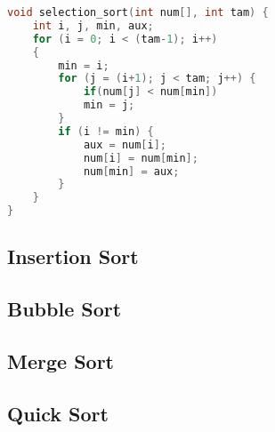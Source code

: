 \documentclass[10pt,a4paper]{article}
\begin{document}
\begin{lstlisting}[language=C++, caption={Selection Sort implemetação}]
void selection_sort(int num[], int tam) { 
	int i, j, min, aux;
  	for (i = 0; i < (tam-1); i++) 
  	{
     	min = i;
     	for (j = (i+1); j < tam; j++) {
       		if(num[j] < num[min]) 
         	min = j;
     	}
     	if (i != min) {
       		aux = num[i];
       		num[i] = num[min];
       		num[min] = aux;
     	}
  	}
}
\end{lstlisting}
\subsection{Insertion Sort}
\subsection{Bubble Sort}
\subsection{Merge Sort}
\subsection{Quick Sort}
\end{document}
